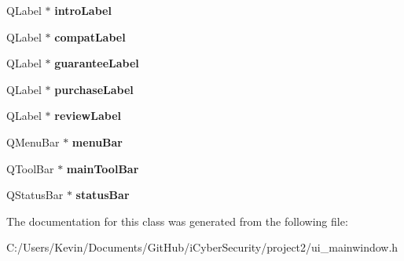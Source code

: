 \begin{DoxyCompactItemize}
\item 
\mbox{\label{class_ui___main_window_afffd4168367a5d174f6d6b19d317ee4f}} 
Q\+Label $\ast$ {\bfseries intro\+Label}
\item 
\mbox{\label{class_ui___main_window_a358d6402556ca5be259dd03cbd4e5383}} 
Q\+Label $\ast$ {\bfseries compat\+Label}
\item 
\mbox{\label{class_ui___main_window_ad9d2d064e83fe3e6d0a778c3c33ccd9b}} 
Q\+Label $\ast$ {\bfseries guarantee\+Label}
\item 
\mbox{\label{class_ui___main_window_a3de9eb25bf7f88be15ef58dcefeb2bf4}} 
Q\+Label $\ast$ {\bfseries purchase\+Label}
\item 
\mbox{\label{class_ui___main_window_ab5ee368f7a2ec0cfdbdfb8b4fabb31c2}} 
Q\+Label $\ast$ {\bfseries review\+Label}
\item 
\mbox{\label{class_ui___main_window_a2be1c24ec9adfca18e1dcc951931457f}} 
Q\+Menu\+Bar $\ast$ {\bfseries menu\+Bar}
\item 
\mbox{\label{class_ui___main_window_a5172877001c8c7b4e0f6de50421867d1}} 
Q\+Tool\+Bar $\ast$ {\bfseries main\+Tool\+Bar}
\item 
\mbox{\label{class_ui___main_window_a50fa481337604bcc8bf68de18ab16ecd}} 
Q\+Status\+Bar $\ast$ {\bfseries status\+Bar}
\end{DoxyCompactItemize}


The documentation for this class was generated from the following file\+:\begin{DoxyCompactItemize}
\item 
C\+:/\+Users/\+Kevin/\+Documents/\+Git\+Hub/i\+Cyber\+Security/project2/ui\+\_\+mainwindow.\+h\end{DoxyCompactItemize}
